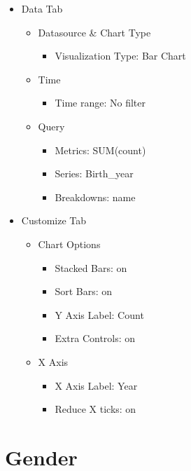 \documentclass[
]{book}
\providecommand{\tightlist}{%
  \setlength{\itemsep}{0pt}\setlength{\parskip}{0pt}}
\begin{document}
\begin{itemize}
\item
  Data Tab

  \begin{itemize}
  \item
    Datasource \& Chart Type

    \begin{itemize}
    \tightlist
    \item
      Visualization Type: Bar Chart
    \end{itemize}
  \item
    Time

    \begin{itemize}
    \tightlist
    \item
      Time range: No filter
    \end{itemize}
  \item
    Query

    \begin{itemize}
    \item
      Metrics: SUM(count)
    \item
      Series: Birth\_year
    \item
      Breakdowns: name
    \end{itemize}
  \end{itemize}
\item
  Customize Tab

  \begin{itemize}
  \item
    Chart Options

    \begin{itemize}
    \item
      Stacked Bars: on
    \item
      Sort Bars: on
    \item
      Y Axis Label: Count
    \item
      Extra Controls: on
    \end{itemize}
  \item
    X Axis

    \begin{itemize}
    \item
      X Axis Label: Year
    \item
      Reduce X ticks: on
    \end{itemize}
  \end{itemize}
\end{itemize}

\hypertarget{gender}{%
\section{Gender}\label{gender}}
\end{document}
